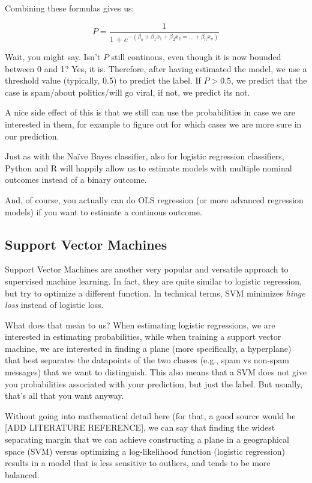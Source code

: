 Combining these formulas gives us:

$$P = \frac{1}{1 + e^{-(\beta_o + \beta_1 x_1 + \beta_2 x_2 = \ldots + \beta_n x_n)}} $$


Wait, you might say. Isn't $P$ still continous, even though it is now bounded between 0 and 1? Yes, it is.
Therefore, after having estimated the model, we use a threshold value (typically, 0.5)
to predict the label. If $P>0.5$, we predict that the case is spam/about politics/will go viral, if not, we predict its not.

A nice side effect of this is that we still can use the probabilities in case we are interested in them, for example to figure out for which cases we are more sure in our prediction.

Just as with the Na\"ive Bayes classifier, also for logistic regression classifiers, Python and R will happily allow us to estimate models with multiple nominal outcomes instead of a binary outcome.

And, of course, you actually can do OLS regression (or more advanced regression models) if you want to estimate a continous outcome.


\subsection{Support Vector Machines}
Support Vector Machines are another very popular and versatile approach to supervised machine learning.
In fact, they are quite similar to logistic regression, but try to optimize a different function. In technical terms, SVM minimizes \emph{hinge loss} instead of logistic loss.

What does that mean to us? When estimating logistic regressions, we are interested
in estimating probabilities, while when training a support vector machine, we are interested in finding a plane (more specifically, a hyperplane) that best separates the datapoints of the two classes (e.g., spam vs non-spam messages) that we want to distinguish.
This also means that a SVM does not give you probabilities associated with your prediction, but just the label.
But usually, that's all that you want anyway.

Without going into mathematical detail here (for that, a good source would be [ADD LITERATURE REFERENCE], we can say that finding the widest separating margin that we can achieve constructing a plane in a geographical space (SVM) versus optimizing a log-likelihood function (logistic regression) results in a model that is less sensitive to outliers, and tends to be more balanced.

